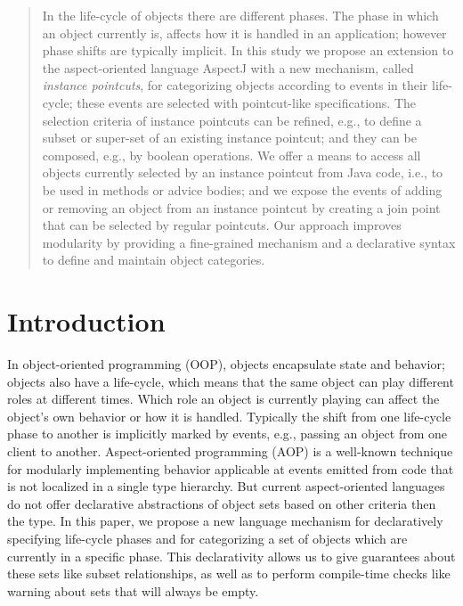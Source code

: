 \maketitle

\begin{abstract}
In the life-cycle of objects there are different phases. The phase in which an object currently is, affects how it is handled in an application; however phase shifts are typically implicit.
In this study we propose an extension to the aspect-oriented language AspectJ with a new mechanism, called \emph{instance pointcuts}, for categorizing objects according to events in their life-cycle; these events are selected with pointcut-like specifications.
The selection criteria of instance pointcuts can be refined, e.g., to define a subset or super-set of an existing instance pointcut; and they can be composed, e.g., by boolean operations.
We offer a means to access all objects currently selected by an instance pointcut from Java code, i.e., to be used in methods or advice bodies; and we expose the events of adding or removing an object from an instance pointcut by creating a join point that can be selected by regular pointcuts.
Our approach improves modularity by providing a fine-grained mechanism and a declarative syntax to define and maintain object categories.
\end{abstract}

\section{Introduction}
In object-oriented programming (OOP), objects encapsulate state and behavior; objects also have a life-cycle, which means that the same object can play different roles at different times.
Which role an object is currently playing can affect the object's own behavior or how it is handled.
Typically the shift from one life-cycle phase to another is implicitly marked by events, e.g., passing an object from one client to another.
Aspect-oriented programming (AOP) is a well-known technique for modularly implementing behavior applicable at events emitted from code that is not localized in a single type hierarchy.
But current aspect-oriented languages do not offer declarative abstractions of object sets based on other criteria then the type.
In this paper, we propose a new language mechanism for declaratively specifying life-cycle phases and for categorizing a set of objects which are currently in a specific phase. This declarativity allows us to give guarantees about these sets like subset relationships, as well as to perform compile-time checks like warning about sets that will always be empty. 

